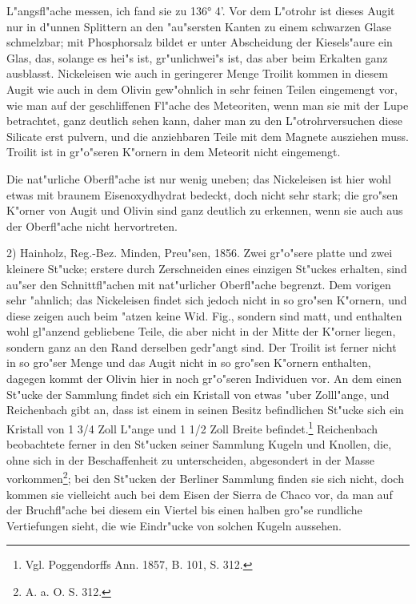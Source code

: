 \documentclass[a4paper, 11pt, oneside, german]{article}
\begin{document}
L"angsfl"ache messen, ich fand sie zu 136° 4’. Vor dem L"otrohr ist dieses Augit nur in d"unnen Splittern an den "au"sersten Kanten zu einem schwarzen Glase schmelzbar; mit Phosphorsalz bildet er unter Abscheidung der Kiesels"aure ein Glas, das, solange es hei"s ist, gr"unlichwei"s ist, das aber beim Erkalten ganz ausblasst. Nickeleisen wie auch in geringerer Menge Troilit kommen in diesem Augit wie auch in dem Olivin gew"ohnlich in sehr feinen Teilen eingemengt vor, wie man auf der geschliffenen Fl"ache des Meteoriten, wenn man sie mit der Lupe betrachtet, ganz deutlich sehen kann, daher man zu den L"otrohrversuchen diese Silicate erst pulvern, und die anziehbaren Teile mit dem Magnete ausziehen muss. Troilit ist in gr"o"seren K"ornern in dem Meteorit nicht eingemengt.

Die nat"urliche Oberfl"ache ist nur wenig uneben; das Nickeleisen ist hier wohl etwas mit braunem Eisenoxydhydrat bedeckt, doch nicht sehr stark; die gro"sen K"orner von Augit und Olivin sind ganz deutlich zu erkennen, wenn sie auch aus der Oberfl"ache nicht hervortreten.

2) Hainholz, Reg.-Bez. Minden, Preu"sen, 1856. Zwei gr"o"sere platte und zwei kleinere St"ucke; erstere durch Zerschneiden eines einzigen St"uckes erhalten, sind au"ser den Schnittfl"achen mit nat"urlicher Oberfl"ache begrenzt. Dem vorigen sehr "ahnlich; das Nickeleisen findet sich jedoch nicht in so gro"sen K"ornern, und diese zeigen auch beim "atzen keine Wid. Fig., sondern sind matt, und enthalten wohl gl"anzend gebliebene Teile, die aber nicht in der Mitte der K"orner liegen, sondern ganz an den Rand derselben gedr"angt sind. Der Troilit ist ferner nicht in so gro"ser Menge und das Augit nicht in so gro"sen K"ornern enthalten, dagegen kommt der Olivin hier in noch gr"o"seren Individuen vor. An dem einen St"ucke der Sammlung findet sich ein Kristall von etwas "uber Zolll"ange, und Reichenbach gibt an, dass ist einem in seinen Besitz befindlichen St"ucke sich ein Kristall von 1 3/4 Zoll L"ange und 1 1/2 Zoll Breite befindet.\footnote{Vgl. Poggendorffs Ann. 1857, B. 101, S. 312.} Reichenbach beobachtete ferner in den St"ucken seiner Sammlung Kugeln und Knollen, die, ohne sich in der Beschaffenheit zu unterscheiden, abgesondert in der Masse vorkommen\footnote{A. a. O. S. 312.}; bei den St"ucken der Berliner Sammlung finden sie sich nicht, doch kommen sie vielleicht auch bei dem Eisen der Sierra de Chaco vor, da man auf der Bruchfl"ache bei diesem ein Viertel bis einen halben gro"se rundliche Vertiefungen sieht, die wie Eindr"ucke von solchen Kugeln aussehen.
\end{document}
